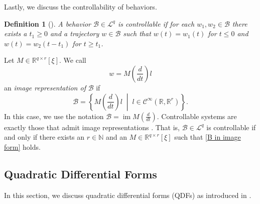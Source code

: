 \documentclass[letterpaper, 10 pt, conference]{ieeeconf}
\theoremstyle{ieeeconf}
\newtheorem{definition}{Definition}
\DeclareMathOperator{\im}{im}
\newcommand{\R}{\mathbb{R}}
\newcommand{\N}{\mathbb{N}}
\newcommand{\B}{\mathcal{B}}
\newcommand{\set}[2]{\left\{ #1 \;\middle| \; #2 \right\}}
\begin{document}
Lastly, we discuss the controllability of behaviors.
\begin{definition}[]
A behavior $\B \in \mathcal{L}^q$ is \emph{controllable} if for each $w_1,w_2 \in \B$ there exists a $t_1 \geq 0$ and a trajectory $w\in \B$ such that $w(t)=w_1(t)$ for $t\leq0$ and ${w(t)=w_2(t-t_1)}$ for $t\geq t_1$.
\end{definition} 
Let $M \in \R^{q \times r}[\xi]$. We call 
\vspace{-1.5ex}
\begin{equation}
w=M \left(\frac{d}{dt}\right)l
\label{image rep}
\end{equation}
an \emph{image representation of} $\B$ if 
\begin{equation}
\B=\set{ M\left(\frac{d}{dt}\right)l}{ l\in \mathcal{C}^\infty(\R,\R^r)}.
\label{B in image form}
\end{equation}
In this case, we use the notation $\B =\im M\left(\frac{d}{dt}\right)$. 
Controllable systems are exactly those that admit image representations \cite{polderman_introduction_1998}. That is, $\B \in \mathcal{L}^q$ is controllable if and only if there exists an $r\in \N$ and an $M \in \R^{q \times r}[\xi]$ such that \eqref{B in image form} holds.

\subsection{Quadratic Differential Forms}
In this section, we discuss quadratic differential forms (QDFs) as introduced in \cite{willems_quadratic_1998}.
\end{document}
